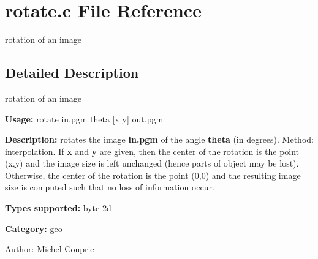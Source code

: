 \section{rotate.c File Reference}
\label{rotate_8c}
rotation of an image  




\label{_details}
\subsection{Detailed Description}
rotation of an image 

{\bf Usage:} rotate in.pgm theta [x y] out.pgm

{\bf Description:} rotates the image {\bf in.pgm} of the angle {\bf theta} (in degrees). Method: interpolation. If {\bf x} and {\bf y} are given, then the center of the rotation is the point (x,y) and the image size is left unchanged (hence parts of object may be lost). Otherwise, the center of the rotation is the point (0,0) and the resulting image size is computed such that no loss of information occur.

{\bf Types supported:} byte 2d

{\bf Category:} geo

\begin{Desc}
\item[Author:]Michel Couprie \end{Desc}
